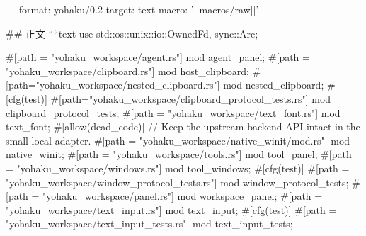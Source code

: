 ---
format: yohaku/0.2
target: text
macro: '[[macros/raw]]'
---

## 正文
````text
use std::{os::unix::io::OwnedFd, sync::Arc};

#[path = "yohaku_workspace/agent.rs"]
mod agent_panel;
#[path = "yohaku_workspace/clipboard.rs"]
mod host_clipboard;
#[path="yohaku_workspace/nested_clipboard.rs"]
mod nested_clipboard;
#[cfg(test)]
#[path="yohaku_workspace/clipboard_protocol_tests.rs"]
mod clipboard_protocol_tests;
#[path = "yohaku_workspace/text_font.rs"]
mod text_font;
#[allow(dead_code)] // Keep the upstream backend API intact in the small local adapter.
#[path = "yohaku_workspace/native_winit/mod.rs"]
mod native_winit;
#[path = "yohaku_workspace/tools.rs"]
mod tool_panel;
#[path = "yohaku_workspace/windows.rs"]
mod tool_windows;
#[cfg(test)]
#[path = "yohaku_workspace/window_protocol_tests.rs"]
mod window_protocol_tests;
#[path = "yohaku_workspace/panel.rs"]
mod workspace_panel;
#[path = "yohaku_workspace/text_input.rs"]
mod text_input;
#[cfg(test)]
#[path = "yohaku_workspace/text_input_tests.rs"]
mod text_input_tests;


